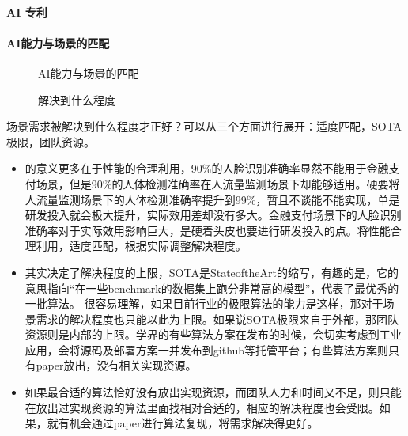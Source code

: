 \documentclass[letterpaper,11pt,english]{sphinxmanual}
\begin{document}
\paragraph{AI 专利}
\label{\detokenize{chapter_introduction/AI_Product:id12}}


\paragraph{AI能力与场景的匹配}
\label{\detokenize{chapter_introduction/AI_Product:id13}}
\begin{figure}[H]
\centering
\capstart

\noindent{}
\caption{AI能力与场景的匹配}\label{\detokenize{chapter_introduction/AI_Product:id22}}\end{figure}

\begin{figure}[H]
\centering
\capstart

\noindent{}
\caption{解决到什么程度}\label{\detokenize{chapter_introduction/AI_Product:id23}}\end{figure}

场景需求被解决到什么程度才正好？可以从三个方面进行展开：适度匹配，SOTA极限，团队资源。
\begin{itemize}
\item {} 
的意义更多在于性能的合理利用，90\%的人脸识别准确率显然不能用于金融支付场景，但是90\%的人体检测准确率在人流量监测场景下却能够适用。硬要将人流量监测场景下的人体检测准确率提升到99\%，暂且不谈能不能实现，单是研发投入就会极大提升，实际效用差却没有多大。金融支付场景下的人脸识别准确率对于实际效用影响巨大，是硬着头皮也要进行研发投入的点。将性能合理利用，适度匹配，根据实际调整解决程度。

\item {} 
其实决定了解决程度的上限，SOTA是State\sphinxhyphen{}of\sphinxhyphen{}the\sphinxhyphen{}Art的缩写，有趣的是，它的意思指向“在一些benchmark的数据集上跑分非常高的模型”，代表了最优秀的一批算法。
很容易理解，如果目前行业的极限算法的能力是这样，那对于场景需求的解决程度也只能以此为上限。如果说SOTA极限来自于外部，那团队资源则是内部的上限。学界的有些算法方案在发布的时候，会切实考虑到工业应用，会将源码及部署方案一并发布到github等托管平台；有些算法方案则只有paper放出，没有相关实现资源。

\item {} 
如果最合适的算法恰好没有放出实现资源，而团队人力和时间又不足，则只能在放出过实现资源的算法里面找相对合适的，相应的解决程度也会受限。如果，就有机会通过paper进行算法复现，将需求解决得更好。

\end{itemize}
\end{document}
